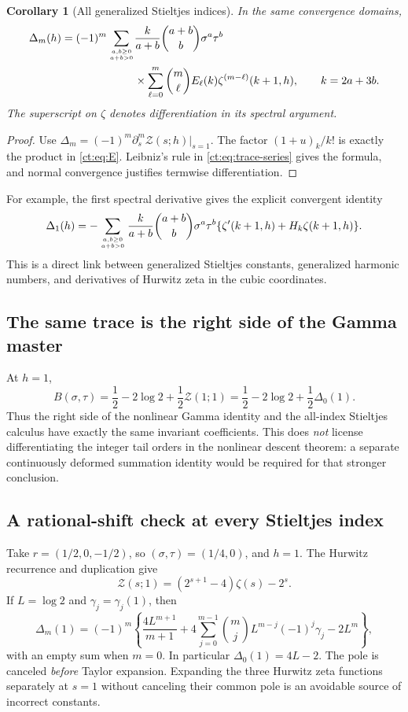 \documentclass[11pt]{article}
\numberwithin{equation}{section}
\newtheorem{corollary}[theorem]{Corollary}
\theoremstyle{definition}\newtheorem{definition}[theorem]{Definition}
\theoremstyle{remark}\newtheorem{remark}[theorem]{Remark}
\newcommand{\Ztr}{\mathcal Z}
\begin{document}
\begin{corollary}[All generalized Stieltjes indices]\label{ct:cor:stieltjes}
In the same convergence domains,
\begin{align}
 \Delta_m(h)=(-1)^m\sum_{a,b\ge0\atop a+b>0}
   &\frac{k}{a+b}\binom{a+b}{b}\sigma^a\tau^b\notag\\
   &\times\sum_{\ell=0}^m\binom m\ell E_\ell(k)
                      \zeta^{(m-\ell)}(k+1,h),\qquad k=2a+3b.
 \label{ct:eq:stieltjes-trace}
\end{align}
The superscript on $\zeta$ denotes differentiation in its spectral argument.
\end{corollary}
\begin{proof}
Use $\Delta_m=(-1)^m\partial_s^m\Ztr(s;h)|_{s=1}$.
The factor $(1+u)_k/k!$ is exactly the product in \eqref{ct:eq:E}.
Leibniz's rule in \eqref{ct:eq:trace-series} gives the formula, and normal
convergence justifies termwise differentiation.
\end{proof}
For example, the first spectral derivative gives the explicit convergent
identity
\begin{equation}\label{ct:eq:gamma1}
 \Delta_1(h)=-\sum_{a,b\ge0\atop a+b>0}
 \frac{k}{a+b}\binom{a+b}{b}\sigma^a\tau^b
       \{\zeta'(k+1,h)+H_k\zeta(k+1,h)\}.
\end{equation}
This is a direct link between generalized Stieltjes constants, generalized
harmonic numbers, and derivatives of Hurwitz zeta in the cubic coordinates.

\subsection{The same trace is the right side of the Gamma master}
At $h=1$,
\begin{equation}\label{ct:eq:B-trace}
 B(\sigma,\tau)=\frac12-2\log2+\frac12\Ztr(1;1)
       =\frac12-2\log2+\frac12\Delta_0(1).
\end{equation}
Thus the right side of the nonlinear Gamma identity and the all-index
Stieltjes calculus have exactly the same invariant coefficients.
This does \emph{not} license differentiating the integer tail orders in the
nonlinear descent theorem: a separate continuously deformed summation
identity would be required for that stronger conclusion.

\subsection{A rational-shift check at every Stieltjes index}
Take $r=(1/2,0,-1/2)$, so $(\sigma,\tau)=(1/4,0)$, and $h=1$.
The Hurwitz recurrence and duplication give
\[
 \Ztr(s;1)=(2^{s+1}-4)\zeta(s)-2^s.
\]
If $L=\log2$ and $\gamma_j=\gamma_j(1)$, then
\begin{equation}\label{ct:eq:half-stieltjes}
 \Delta_m(1)=(-1)^m\left\{
 \frac{4L^{m+1}}{m+1}
 +4\sum_{j=0}^{m-1}\binom mj L^{m-j}(-1)^j\gamma_j
 -2L^m\right\},
\end{equation}
with an empty sum when $m=0$. In particular $\Delta_0(1)=4L-2$.
The pole is canceled \emph{before} Taylor expansion. Expanding the three
Hurwitz zeta functions separately at $s=1$ without canceling their common
pole is an avoidable source of incorrect constants.
\end{document}
